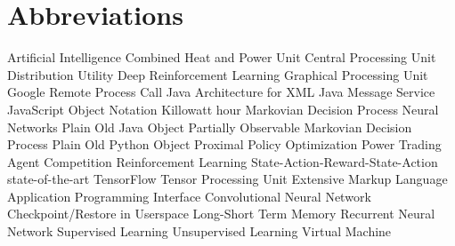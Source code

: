 \newpage
\section*{Abbreviations}
\begin        {acronym}[PowerTAC]
	       {Artificial Intelligence}
	      {Combined Heat and Power Unit}
	      {Central Processing Unit}
	       {Distribution Utility}
	   {Deep Reinforcement Learning}
	      {Graphical Processing Unit}
	     {Google Remote Process Call}
	     {Java Architecture for XML}
	      {Java Message Service}
	     {JavaScript Object Notation}
          {Killowatt hour}
	      {Markovian Decision Process}
	       {Neural Networks}
	     {Plain Old Java Object}
	    {Partially Observable Markovian Decision Process}
	     {Plain Old Python Object}
	      {Proximal Policy Optimization}
	 {Power Trading Agent Competition}
	       {Reinforcement Learning}
	    {State-Action-Reward-State-Action}
	     {state-of-the-art}
	       {TensorFlow}
	      {Tensor Processing Unit}
	      {Extensive Markup Language}
          {Application Programming Interface}
          {Convolutional Neural Network}
         {Checkpoint/Restore in Userspace}
         {Long-Short Term Memory}
          {Recurrent Neural Network}
           {Supervised Learning}
           {Unsupervised Learning}
           {Virtual Machine}

\end          {acronym}
